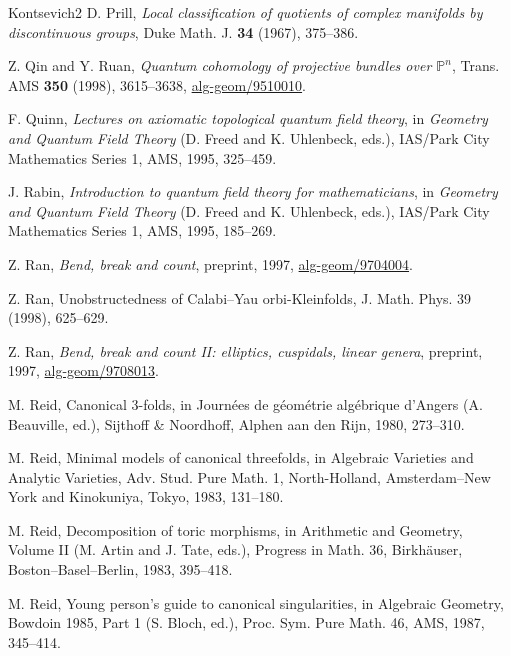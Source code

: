 \begin{thebibliography}{Kontsevich2}
\hypertarget{bib:Prill}{} D. Prill, \emph{Local classification of quotients of complex manifolds by discontinuous groups}, Duke Math. J. \textbf{34} (1967), 375--386.

\hypertarget{bib:QR}{} Z. Qin and Y. Ruan, \emph{Quantum cohomology of projective bundles over $\mathbb P^n$}, Trans. AMS \textbf{350} (1998), 3615--3638, \href{https://arxiv.org/abs/alg-geom/9510010}{alg-geom/9510010}.

\hypertarget{bib:Quinn}{} F. Quinn, \emph{Lectures on axiomatic topological quantum field theory}, in \emph{Geometry and Quantum Field Theory} (D. Freed and K. Uhlenbeck, eds.), IAS/Park City Mathematics Series 1, AMS, 1995, 325--459.

\hypertarget{bib:Rabin}{} J. Rabin, \emph{Introduction to quantum field theory for mathematicians}, in \emph{Geometry and Quantum Field Theory} (D. Freed and K. Uhlenbeck, eds.), IAS/Park City Mathematics Series 1, AMS, 1995, 185--269.

\hypertarget{bib:Ran1}{} Z. Ran, \emph{Bend, break and count}, preprint, 1997, \href{https://arxiv.org/abs/alg-geom/9704004}{alg-geom/9704004}.

\hypertarget{bib:Ran2}{}
Z. Ran, Unobstructedness of Calabi--Yau orbi-Kleinfolds, J. Math. Phys. 39 (1998), 625--629.

\hypertarget{bib:Ran3}{} Z. Ran, \emph{Bend, break and count II: elliptics, cuspidals, linear genera}, preprint, 1997, \href{https://arxiv.org/abs/alg-geom/9708013}{alg-geom/9708013}.

\hypertarget{bib:Reid1}{}
M. Reid, Canonical 3-folds,
in Journées de géométrie algébrique d'Angers (A. Beauville, ed.),
Sijthoff \& Noordhoff, Alphen aan den Rijn, 1980, 273--310.

\hypertarget{bib:Reid2}{}
M. Reid, Minimal models of canonical threefolds, in Algebraic Varieties and Analytic Varieties, Adv. Stud. Pure Math. 1, North-Holland, Amsterdam--New York and Kinokuniya, Tokyo, 1983, 131--180.

\hypertarget{bib:Reid3}{}
M. Reid, Decomposition of toric morphisms,
in Arithmetic and Geometry, Volume II (M. Artin and J. Tate, eds.),
Progress in Math. 36, Birkhäuser, Boston--Basel--Berlin, 1983, 395--418.

\hypertarget{bib:Reid4}{}
M. Reid, Young person's guide to canonical singularities,
in Algebraic Geometry, Bowdoin 1985, Part 1 (S. Bloch, ed.),
Proc. Sym. Pure Math. 46, AMS, 1987, 345--414.


\end{thebibliography}
